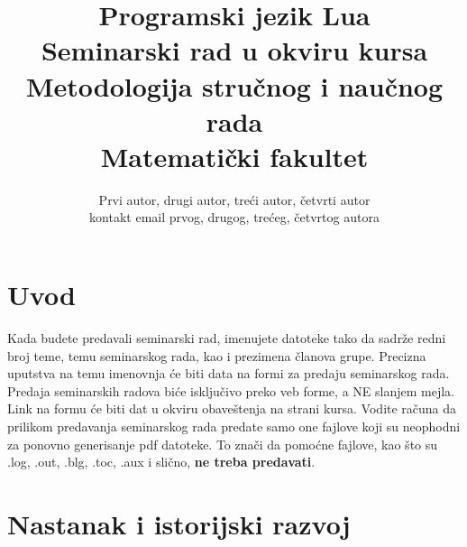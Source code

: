 \documentclass[a4paper]{article}
\begin{document}
\title{Programski jezik Lua\\ \small{Seminarski rad u okviru kursa\\Metodologija stručnog i naučnog rada\\ Matematički fakultet}}

\author{Prvi autor, drugi autor, treći autor, četvrti autor\\ kontakt email prvog, drugog, trećeg, četvrtog autora}


\maketitle


\tableofcontents

\newpage

\section{Uvod}
\label{sec:uvod}

Kada budete predavali seminarski rad, imenujete datoteke tako da sadrže redni broj teme, temu seminarskog rada, kao i prezimena članova grupe. Precizna uputstva na temu imenovnja će biti data na formi za predaju seminarskog rada. Predaja seminarskih radova biće isključivo preko veb forme, a NE slanjem mejla. Link na formu će biti dat u okviru obaveštenja na strani kursa. Vodite računa da prilikom predavanja seminarskog rada predate samo one fajlove koji su neophodni za ponovno generisanje pdf datoteke. To znači da pomoćne fajlove, kao što su .log, .out, .blg, .toc, .aux i slično, \textbf{ne treba predavati}.

\section{Nastanak i istorijski razvoj}
\label{sec:istorijski_razvoj}
\end{document}
